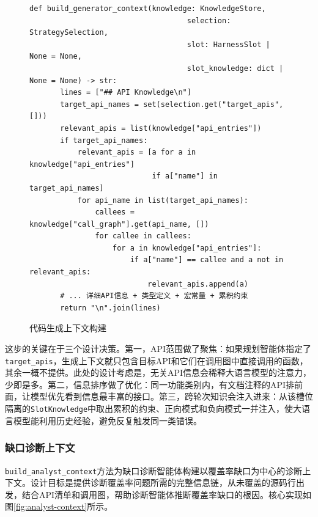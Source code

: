 \begin{figure}[H]
    \centering
    \begin{lstlisting}[style=style@python]
   def build_generator_context(knowledge: KnowledgeStore,
                                    selection: StrategySelection,
                                    slot: HarnessSlot | None = None,
                                    slot_knowledge: dict | None = None) -> str:
       lines = ["## API Knowledge\n"]
       target_api_names = set(selection.get("target_apis", []))
       relevant_apis = list(knowledge["api_entries"])
       if target_api_names:
           relevant_apis = [a for a in knowledge["api_entries"]
                            if a["name"] in target_api_names]
           for api_name in list(target_api_names):
               callees = knowledge["call_graph"].get(api_name, [])
               for callee in callees:
                   for a in knowledge["api_entries"]:
                       if a["name"] == callee and a not in relevant_apis:
                           relevant_apis.append(a)
       # ... 详细API信息 + 类型定义 + 宏常量 + 累积约束
       return "\n".join(lines)
    \end{lstlisting}
    \caption{代码生成上下文构建}
    \label{fig:generator-context}
\end{figure}

这步的关键在于三个设计决策。第一，API范围做了聚焦：如果规划智能体指定了\texttt{target\_apis}，生成上下文就只包含目标API和它们在调用图中直接调用的函数，其余一概不提供。此处的设计考虑是，无关API信息会稀释大语言模型的注意力，少即是多。第二，信息排序做了优化：同一功能类别内，有文档注释的API排前面，让模型优先看到信息最丰富的接口。第三，跨轮次知识会注入进来：从该槽位隔离的\texttt{SlotKnowledge}中取出累积的约束、正向模式和负向模式一并注入，使大语言模型能利用历史经验，避免反复触发同一类错误。

\subsubsection{缺口诊断上下文}

\texttt{build\_analyst\_context}方法为缺口诊断智能体构建以覆盖率缺口为中心的诊断上下文。设计目标是提供诊断覆盖率问题所需的完整信息链，从未覆盖的源码行出发，结合API清单和调用图，帮助诊断智能体推断覆盖率缺口的根因。核心实现如图\ref{fig:analyst-context}所示。

